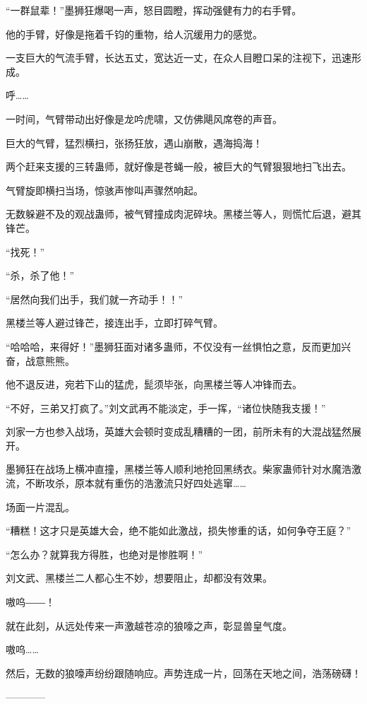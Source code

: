 \begin{this_body}
“一群鼠辈！”墨狮狂爆喝一声，怒目圆瞪，挥动强健有力的右手臂。

他的手臂，好像是拖着千钧的重物，给人沉缓用力的感觉。

一支巨大的气流手臂，长达五丈，宽达近一丈，在众人目瞪口呆的注视下，迅速形成。

呼……

一时间，气臂带动出好像是龙吟虎啸，又仿佛飓风席卷的声音。

巨大的气臂，猛烈横扫，张扬狂放，遇山崩散，遇海捣海！

两个赶来支援的三转蛊师，就好像是苍蝇一般，被巨大的气臂狠狠地扫飞出去。

气臂旋即横扫当场，惊骇声惨叫声骤然响起。

无数躲避不及的观战蛊师，被气臂撞成肉泥碎块。黑楼兰等人，则慌忙后退，避其锋芒。

“找死！”

“杀，杀了他！”

“居然向我们出手，我们就一齐动手！！”

黑楼兰等人避过锋芒，接连出手，立即打碎气臂。

“哈哈哈，来得好！”墨狮狂面对诸多蛊师，不仅没有一丝惧怕之意，反而更加兴奋，战意熊熊。

他不退反进，宛若下山的猛虎，髭须毕张，向黑楼兰等人冲锋而去。

“不好，三弟又打疯了。”刘文武再不能淡定，手一挥，“诸位快随我支援！”

刘家一方也参入战场，英雄大会顿时变成乱糟糟的一团，前所未有的大混战猛然展开。

墨狮狂在战场上横冲直撞，黑楼兰等人顺利地抢回黑绣衣。柴家蛊师针对水魔浩激流，不断攻杀，原本就有重伤的浩激流只好四处逃窜……

场面一片混乱。

“糟糕！这才只是英雄大会，绝不能如此激战，损失惨重的话，如何争夺王庭？”

“怎么办？就算我方得胜，也绝对是惨胜啊！”

刘文武、黑楼兰二人都心生不妙，想要阻止，却都没有效果。

嗷呜――！

就在此刻，从远处传来一声激越苍凉的狼嚎之声，彰显兽皇气度。

嗷呜……

然后，无数的狼嚎声纷纷跟随响应。声势连成一片，回荡在天地之间，浩荡磅礴！

------------

\end{this_body}

